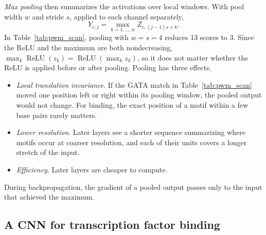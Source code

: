 \emph{Max pooling} then summarizes the activations over local windows. With pool width $w$ and stride $s$, applied to each channel separately,
\begin{equation}
  Y_{c,j} = \max_{k=1,\dots,w} Z_{c,(j-1)s+k}.
\end{equation}
In Table~\ref{tab:pwm_scan}, pooling with $w=s=4$ reduces 13 scores to 3. Since the ReLU and the maximum are both nondecreasing, $\max_k\operatorname{ReLU}(z_k)=\operatorname{ReLU}(\max_kz_k)$, so it does not matter whether the ReLU is applied before or after pooling. Pooling has three effects.
\begin{itemize}
  \item \emph{Local translation invariance}. If the GATA match in Table~\ref{tab:pwm_scan} moved one position left or right within its pooling window, the pooled output would not change. For binding, the exact position of a motif within a few base pairs rarely matters.
  \item \emph{Lower resolution}. Later layers see a shorter sequence summarizing where motifs occur at coarser resolution, and each of their units covers a longer stretch of the input.
  \item \emph{Efficiency}. Later layers are cheaper to compute.
\end{itemize}
During backpropagation, the gradient of a pooled output passes only to the input that achieved the maximum.

\subsection{A CNN for transcription factor binding}

